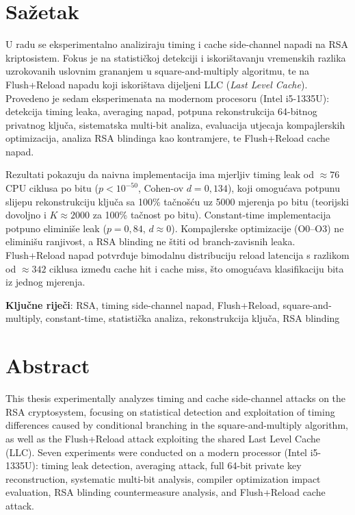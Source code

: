 \pagebreak

\section*{Sažetak}

U radu se eksperimentalno analiziraju timing i cache side-channel napadi na RSA kriptosistem. Fokus je na statističkoj detekciji i iskorištavanju vremenskih razlika uzrokovanih uslovnim grananjem u square-and-multiply algoritmu, te na Flush+Reload napadu koji iskorištava dijeljeni LLC (\textit{Last Level Cache}). Provedeno je sedam eksperimenata na modernom procesoru (Intel i5-1335U): detekcija timing leaka, averaging napad, potpuna rekonstrukcija 64-bitnog privatnog ključa, sistematska multi-bit analiza, evaluacija utjecaja kompajlerskih optimizacija, analiza RSA blindinga kao kontramjere, te Flush+Reload cache napad.

Rezultati pokazuju da naivna implementacija ima mjerljiv timing leak od $\approx 76$ CPU ciklusa po bitu ($p < 10^{-50}$, Cohen-ov $d = 0{,}134$), koji omogućava potpunu slijepu rekonstrukciju ključa sa 100\% tačnošću uz 5000 mjerenja po bitu (teorijski dovoljno i $K \approx 2000$ za 100\% tačnost po bitu). Constant-time implementacija potpuno eliminiše leak ($p = 0{,}84$, $d \approx 0$). Kompajlerske optimizacije (O0--O3) ne eliminišu ranjivost, a RSA blinding ne štiti od branch-zavisnih leaka. Flush+Reload napad potvrđuje bimodalnu distribuciju reload latencija s razlikom od $\approx 342$ ciklusa između cache hit i cache miss, što omogućava klasifikaciju bita iz jednog mjerenja.

\bigskip
\textbf{Ključne riječi}: RSA, timing side-channel napad, Flush+Reload, square-and-multiply, constant-time, statistička analiza, rekonstrukcija ključa, RSA blinding

\section*{Abstract}

This thesis experimentally analyzes timing and cache side-channel attacks on the RSA cryptosystem, focusing on statistical detection and exploitation of timing differences caused by conditional branching in the square-and-multiply algorithm, as well as the Flush+Reload attack exploiting the shared Last Level Cache (LLC). Seven experiments were conducted on a modern processor (Intel i5-1335U): timing leak detection, averaging attack, full 64-bit private key reconstruction, systematic multi-bit analysis, compiler optimization impact evaluation, RSA blinding countermeasure analysis, and Flush+Reload cache attack.

